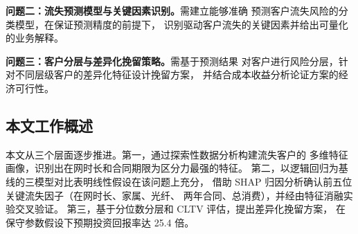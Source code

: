\textbf{问题二：流失预测模型与关键因素识别。}需建立能够准确
预测客户流失风险的分类模型，在保证预测精度的前提下，
识别驱动客户流失的关键因素并给出可量化的业务解释。

\textbf{问题三：客户分层与差异化挽留策略。}需基于预测结果
对客户进行风险分层，针对不同层级客户的差异化特征设计挽留方案，
并结合成本收益分析论证方案的经济可行性。

\subsection{本文工作概述}

本文从三个层面逐步推进。第一，通过探索性数据分析构建流失客户的
多维特征画像，识别出在网时长和合同期限为区分力最强的特征。
第二，以逻辑回归为基线的三模型对比表明线性假设在该问题上充分，
借助 SHAP 归因分析确认前五位关键流失因子（在网时长、家属、光纤、
两年合同、总消费），并经由特征消融实验交叉验证。
第三，基于分位数分层和 CLTV 评估，提出差异化挽留方案，
在保守参数假设下预期投资回报率达 25.4 倍。
